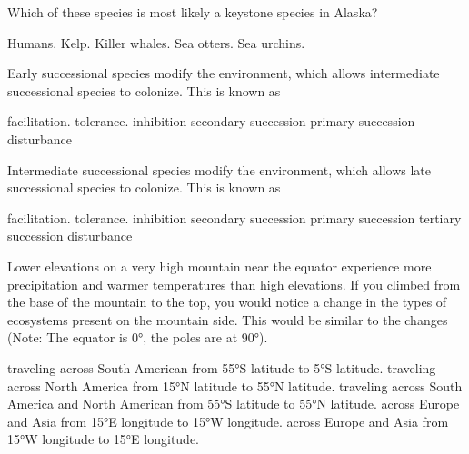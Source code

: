 \question
Which of these species is most likely a keystone species in Alaska?

\begin{choices}
	\choice Humans.  %
	\choice Kelp.  %
	\choice Killer whales. %
	\correctchoice Sea otters. %
	\choice Sea urchins.  %
\end{choices}



\question
Early successional species modify the environment, which allows intermediate successional species to colonize. This is known as

\begin{choices}
\correctchoice facilitation. %
\choice tolerance. %
\choice inhibition %
\choice secondary succession %
\choice primary succession %
\choice disturbance %
\end{choices}

\question
Intermediate successional species modify the environment, which allows late successional species to colonize. This is known as

\begin{choices}
	\correctchoice facilitation. %
	\choice tolerance. %
	\choice inhibition %
	\choice secondary succession %
	\choice primary succession %
	\choice tertiary succession %
	\choice disturbance %
\end{choices}


\question
Lower elevations on a very high mountain near the equator experience more precipitation and warmer temperatures than high elevations. If you climbed from the base of the mountain to the top, you would notice a change in the types of ecosystems present on the mountain side. This would be similar to the changes (Note: The equator is 0°, the poles are at 90°). 

\begin{choices}
\choice traveling across South American from 55°S latitude to 5°S latitude.%
\correctchoice traveling across North America from 15°N latitude to 55°N latitude.%
\choice traveling across South America and North American from 55°S latitude to 55°N latitude.%
\choice across Europe and Asia from 15°E longitude to 15°W longitude.%
\choice across Europe and Asia from 15°W longitude to 15°E longitude.%
\end{choices}

